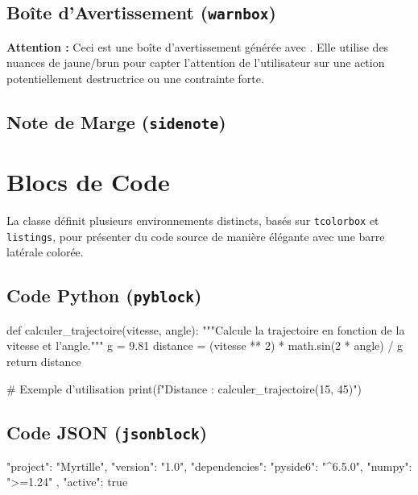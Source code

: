 \subsection{Boîte d'Avertissement (\texttt{warnbox})}
\begin{warnbox}
    \textbf{Attention :} Ceci est une boîte d'avertissement générée avec . Elle utilise des nuances de jaune/brun pour capter l'attention de l'utilisateur sur une action potentiellement destructrice ou une contrainte forte.
\end{warnbox}

\subsection{Note de Marge (\texttt{sidenote})}


\section{Blocs de Code}

La classe définit plusieurs environnements distincts, basés sur \texttt{tcolorbox} et \texttt{listings}, pour présenter du code source de manière élégante avec une barre latérale colorée.

\subsection{Code Python (\texttt{pyblock})}
\begin{pyblock}
def calculer_trajectoire(vitesse, angle):
    """Calcule la trajectoire en fonction de la vitesse et l'angle."""
    g = 9.81
    distance = (vitesse ** 2) * math.sin(2 * angle) / g
    return distance

# Exemple d'utilisation
print(f"Distance : {calculer_trajectoire(15, 45)}")
\end{pyblock}

\subsection{Code JSON (\texttt{jsonblock})}
\begin{jsonblock}
{
  "project": "Myrtille",
  "version": "1.0",
  "dependencies": {
    "pyside6": "^6.5.0",
    "numpy": ">=1.24"
  },
  "active": true
}
\end{jsonblock}

